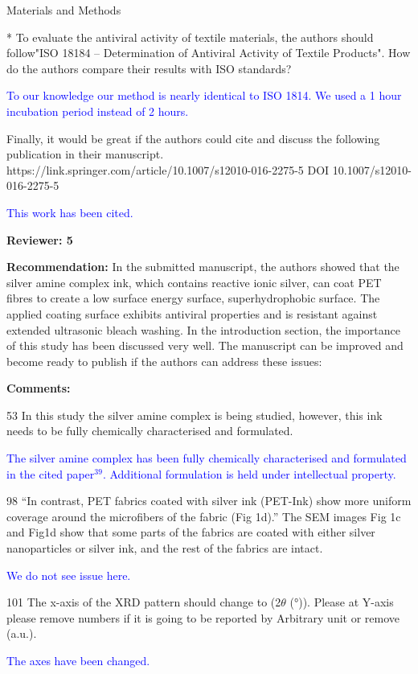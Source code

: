 \documentclass[12pt]{letter}
\newcommand{\blue}[1]{\textcolor{blue}{#1}} %
\begin{document}
Materials and Methods

* To evaluate the antiviral activity of textile materials, the authors should follow"ISO 18184 – Determination of Antiviral Activity of Textile Products". How do the authors compare their results with ISO standards?

\blue{To our knowledge our method is nearly identical to ISO 1814. We used a 1 hour incubation period instead of 2 hours.}

Finally, it would be great if the authors could cite and discuss the following publication in their manuscript. https://link.springer.com/article/10.1007/s12010-016-2275-5
DOI 10.1007/s12010-016-2275-5

\blue{This work has been cited. }

\newpage
\textbf{Reviewer: 5}

\textbf{Recommendation:}
In the submitted manuscript, the authors showed that the silver amine complex ink, which contains reactive ionic silver, can coat PET fibres to create a low surface energy surface, superhydrophobic surface. The applied coating surface exhibits antiviral properties and is resistant against extended ultrasonic bleach washing. In the introduction section, the importance of this study has been discussed very well. The manuscript can be improved and become ready to publish if the authors can address these issues:

\textbf{Comments:} 

53 In this study the silver amine complex is being studied, however, this ink needs to be fully chemically characterised and formulated.

\blue{The silver amine complex has been fully chemically characterised and formulated in the cited paper$^{39}$. Additional formulation is held under intellectual property.}

98 “In contrast, PET fabrics coated with silver ink (PET-Ink) show more uniform coverage around the microfibers of the fabric (Fig 1d).”
The SEM images Fig 1c and Fig1d show that some parts of the fabrics are coated with either silver nanoparticles or silver ink, and the rest of the fabrics are intact.

\blue{We do not see issue here. }

101 The x-axis of the XRD pattern should change to (2$\theta$ (°)). Please at Y-axis please remove numbers if it is going to be reported by Arbitrary unit or remove (a.u.).

\blue{The axes have been changed. }
\end{document}

